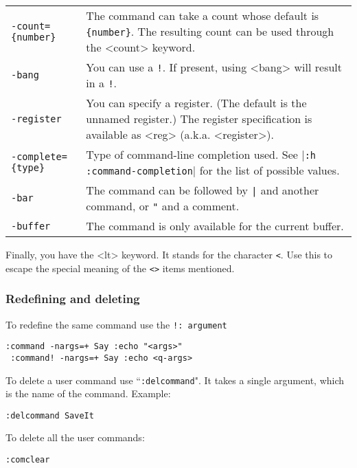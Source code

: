 \begin{center} \begin{tabularx} {\textwidth}{l X} %
				\texttt{-count=\{number\}} & The command can take a count whose default is \texttt{\{number\}}.  The resulting count can be used through the <count> keyword. \\
				\texttt{-bang} & You can use a \texttt{!}.  If present, using <bang> will result in a \texttt{!}. \\
				\texttt{-register} & You can specify a register.  (The default is the unnamed register.) The register specification is available as <reg> (a.k.a. <register>). \\
				\texttt{-complete=\{type\}} & Type of command-line completion used.  See |\texttt{:h :command-completion}| for the list of possible values. \\
				\texttt{-bar} & The command can be followed by \texttt{|} and another command, or \texttt{"} and a comment. \\
				\texttt{-buffer} & The command is only available for the current buffer. \\
\end{tabularx} \end{center}

Finally, you have the <lt> keyword.
It stands for the character \texttt{<}.
Use this to escape the special meaning of the \texttt{<>} items mentioned.

\subsubsection{Redefining and deleting}
To redefine the same command use the \texttt{!: argument}

\begin{Verbatim}[samepage=true]
 :command -nargs=+ Say :echo "<args>"
 :command! -nargs=+ Say :echo <q-args>
\end{Verbatim}

To delete a user command use ``\texttt{:delcommand}".
It takes a single argument, which is the name of the command.
Example:

\begin{Verbatim}[samepage=true]
 :delcommand SaveIt
\end{Verbatim}

To delete all the user commands:

\begin{Verbatim}[samepage=true]
 :comclear
\end{Verbatim}

